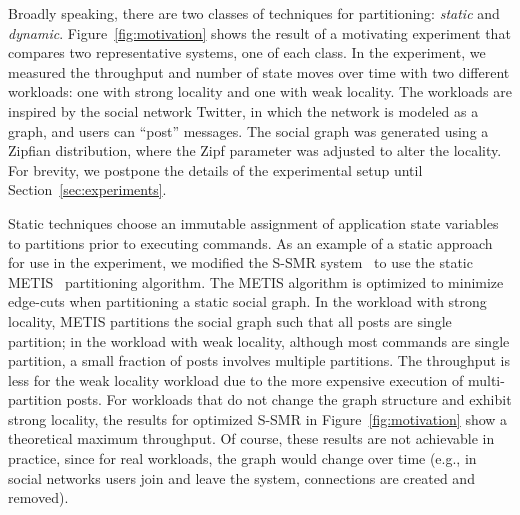 Broadly speaking, there are two classes of techniques for
partitioning: \emph{static} and \emph{dynamic}.
Figure~\ref{fig:motivation} shows the result of a motivating
experiment that compares two representative systems, one of each class. In the
experiment, we measured the throughput and number of state moves over
time with two different workloads: one with strong locality and one
with weak locality. The workloads are inspired by the social network
Twitter, in which the network is modeled as a graph, and users can
``post'' messages. The social graph was generated using a Zipfian
distribution, where the Zipf parameter was adjusted to alter the
locality.  For brevity, we postpone the details of the experimental
setup until Section~\ref{sec:experiments}.


Static techniques choose an immutable assignment of application state variables to partitions
prior to executing commands. As an example of a static approach for
use in the experiment, we modified the S-SMR
system~\cite{bezerra2014ssmr} to use the static
METIS~\cite{Abou-Rjeili:2006} partitioning algorithm.  The METIS
algorithm is optimized to minimize edge-cuts when partitioning a
static social graph. 
In the workload with strong locality, METIS partitions the social graph such that all posts are single partition;
in the workload with weak locality, although most commands are single partition, a small fraction of posts involves multiple partitions.
The throughput is less for the weak locality workload due to the more expensive execution of multi-partition posts.
For workloads that do not change the graph structure and exhibit strong locality, the
results for optimized S-SMR in Figure~\ref{fig:motivation} show a theoretical maximum
throughput.  Of course, these results are not achievable in practice,
since for real workloads, the graph would change over time (e.g., in
social networks users join and leave the system, connections are
created and removed).


